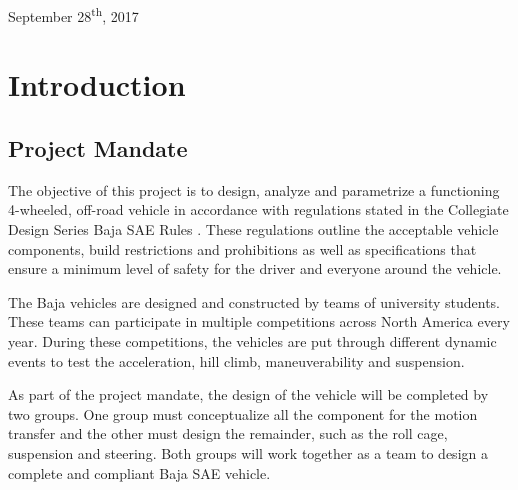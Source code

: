 \documentclass[12pt,twoside]{article}
\begin{document}
\begin{titlepage}
\begin{center}
			
			
			{\large September 28\textsuperscript{th}, 2017}\\
			
			\vfill %
			
		\end{center} %
		
	\end{titlepage} %
	
	\renewcommand{\thepage}{\roman{page}} %
	\newpage %
	\tableofcontents
	\thispagestyle{plain}
	\newpage
	\listoffigures
	\newpage
	\listoftables
    \newpage
    \thispagestyle{plain}
    \printglossary[type=\acronymtype]    
    \newpage
	
	\renewcommand{\thepage}{\arabic{page}}
	\setcounter{page}{1}
		
	\section{Introduction}
    \subsection{Project Mandate}
    The objective of this project is to design, analyze and parametrize a functioning 4-wheeled, off-road vehicle in accordance with regulations stated in the Collegiate Design Series Baja \acrfull{SAE} Rules \cite{bajarules}. These regulations outline the acceptable vehicle components, build restrictions and prohibitions as well as specifications that ensure a minimum level of safety for the driver and everyone around the vehicle. 
    
    The Baja vehicles are designed and constructed by teams of university students. These teams can participate in multiple competitions across North America every year. During these competitions, the vehicles are put through different dynamic events to test the acceleration, hill climb, maneuverability and suspension. 
    
    As part of the project mandate, the design of the vehicle will be completed by two groups. One group must conceptualize all the component for the motion transfer and the other must design the remainder, such as the roll cage, suspension and steering. Both groups will work together as a team to design a complete and compliant Baja SAE vehicle.
    
\end{document}

